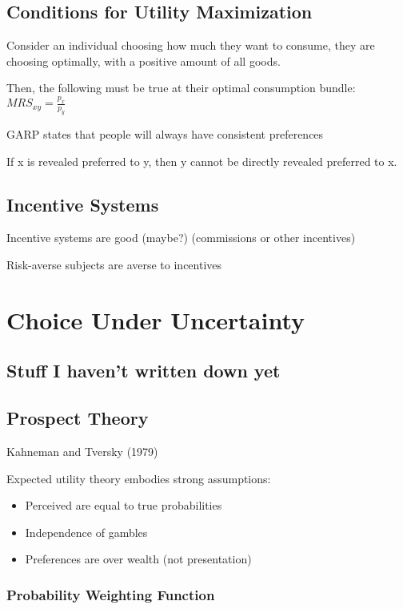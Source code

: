 \documentclass[12pt]{article}
\begin{document}
\subsection{Conditions for Utility Maximization}

Consider an individual choosing how much they want to consume, they are choosing optimally, with a positive amount of all goods.

Then, the following must be true at their optimal consumption bundle: $MRS_{xy} = \frac{p_{x}}{p_{y}}$

GARP states that people will always have consistent preferences

If x is revealed preferred to y, then y cannot be directly revealed preferred to x.

\subsection{Incentive Systems}

Incentive systems are good (maybe?) (commissions or other incentives)

Risk-averse subjects are averse to incentives

\section{Choice Under Uncertainty}

\subsection{Stuff I haven't written down yet}

\subsection{Prospect Theory}

Kahneman and Tversky (1979)

Expected utility theory embodies strong assumptions:
\begin{itemize}
    \item Perceived are equal to true probabilities
    \item Independence of gambles
    \item Preferences are over wealth (not presentation)
\end{itemize}

\subsubsection{Probability Weighting Function}
\end{document}
